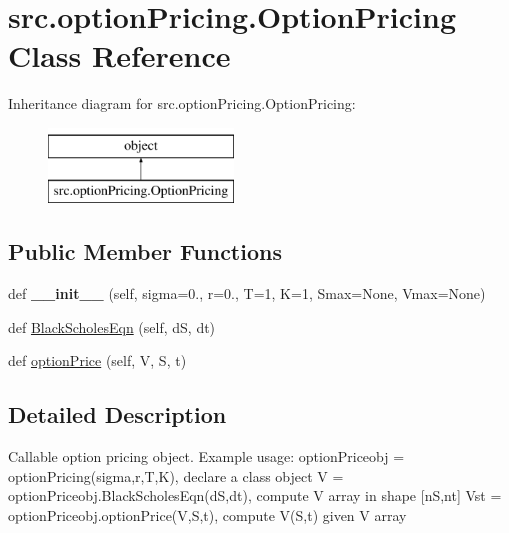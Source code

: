 \hypertarget{classsrc_1_1optionPricing_1_1OptionPricing}{}\section{src.\+option\+Pricing.\+Option\+Pricing Class Reference}
\label{classsrc_1_1optionPricing_1_1OptionPricing}
Inheritance diagram for src.\+option\+Pricing.\+Option\+Pricing\+:\begin{figure}[H]
\begin{center}
\leavevmode
\includegraphics[height=2.000000cm]{classsrc_1_1optionPricing_1_1OptionPricing}
\end{center}
\end{figure}
\subsection*{Public Member Functions}
\begin{DoxyCompactItemize}
\item 
\mbox{\label{classsrc_1_1optionPricing_1_1OptionPricing_a4642cf5de43033ea6af43adb2bd79b49}} 
def {\bfseries \+\_\+\+\_\+init\+\_\+\+\_\+} (self, sigma=0., r=0., T=1, K=1, Smax=None, Vmax=None)
\item 
def \hyperlink{classsrc_1_1optionPricing_1_1OptionPricing_a5ee60e0ef4ec623ffca945b42d21c567}{Black\+Scholes\+Eqn} (self, dS, dt)
\item 
def \hyperlink{classsrc_1_1optionPricing_1_1OptionPricing_affc466184874e04ddc6deae50c50e8eb}{option\+Price} (self, V, S, t)
\end{DoxyCompactItemize}


\subsection{Detailed Description}
\begin{DoxyVerb}Callable option pricing object.
Example usage:
optionPriceobj = optionPricing(sigma,r,T,K), declare a class object
V = optionPriceobj.BlackScholesEqn(dS,dt), compute V array in shape [nS,nt]
Vst = optionPriceobj.optionPrice(V,S,t), compute V(S,t) given V array
\end{DoxyVerb}
 

